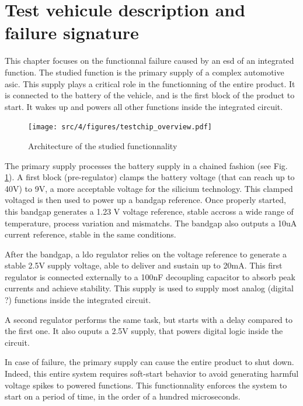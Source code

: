 \section{Test vehicule description and failure signature}

This chapter focuses on the functionnal failure caused by an \gls{esd} of an integrated function.
The studied function is the primary supply of a complex automotive \gls{asic}.
This supply plays a critical role in the functionning of the entire product.
It is connected to the battery of the vehicle, and is the first block of the product to start.
It wakes up and powers all other functions inside the integrated circuit.

\begin{figure}[h]
  \centering
  \texttt{[image: src/4/figures/testchip\_overview.pdf]}
  \caption{Architecture of the studied functionnality}
  \label{testchip_overview}
\end{figure}

The primary supply processes the battery supply in a chained fashion (see Fig. \ref{testchip_overview}).
A first block (pre-regulator) clamps the battery voltage (that can reach up to 40V) to 9V, a more acceptable voltage for the silicium technology.
This clamped voltaged is then used to power up a bandgap reference.
Once properly started, this bandgap generates a 1.23 V voltage reference, stable accross a wide range of temperature, process variation and mismatchs.
The bandgap also outputs a 10uA current reference, stable in the same conditions.

After the bandgap, a \gls{ldo} regulator relies on the voltage reference to generate a stable 2.5V supply voltage, able to deliver and sustain up to 20mA.
This first regulator is connected externally to a 100nF decoupling capacitor to absorb peak currents and achieve stability.
This supply is used to supply most analog (digital ?) functions inside the integrated circuit.

A second regulator performs the same task, but starts with a delay compared to the first one.
It also ouputs a 2.5V supply, that powers digital logic inside the circuit.

In case of failure, the primary supply can cause the entire product to shut down.
Indeed, this entire system requires soft-start behavior to avoid generating harmful voltage spikes to powered functions.
This functionnality enforces the system to start on a  period of time, in the order of a hundred microseconds.

